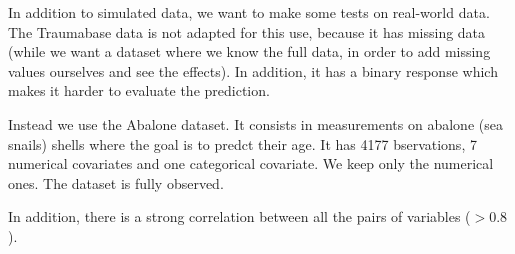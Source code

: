 In addition to simulated data, we want to make some tests on real-world data. The Traumabase data is not adapted for this use, because it has missing data (while we want a dataset where we know the full data, in order to add missing values ourselves and see the effects). In addition, it has a binary response which makes it harder to evaluate the prediction.

Instead we use the Abalone \cite{nash1994abalone} dataset. It consists in measurements on abalone (sea snails) shells where the goal is to predct their age. It has 4177 bservations, 7 numerical covariates and one categorical covariate. We keep only the numerical ones. The dataset is fully observed. 

In addition, there is a strong correlation between all the pairs of variables ($>0.8$).